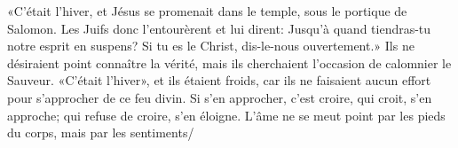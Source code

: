  «C’était l’hiver, et Jésus se promenait dans le temple,
	sous le portique de Salomon.
Les Juifs donc l’entourèrent et lui dirent:
	Jusqu’à quand tiendras-tu notre esprit en suspens?
	Si tu es le Christ, dis-le-nous ouvertement.»
Ils ne désiraient point connaître la vérité,
	mais ils cherchaient l’occasion de calomnier le Sauveur.
«C’était l’hiver», et ils étaient froids,
	car ils ne faisaient aucun effort pour s’approcher de ce feu divin.
Si s’en approcher, c’est croire,
	qui croit, s’en approche;
	qui refuse de croire, s’en éloigne.
L'âme ne se meut point par les pieds du corps,
	mais par les sentiments/